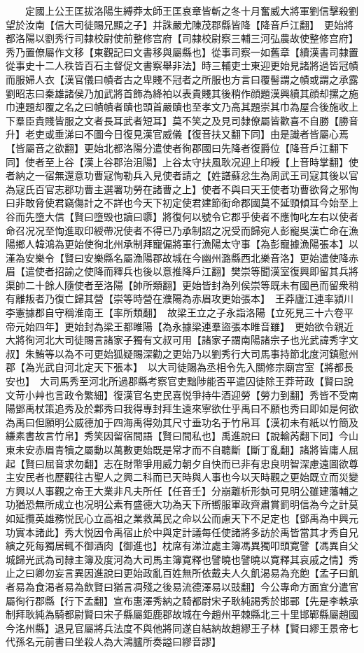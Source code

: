 　　定國上公王匡拔洛陽生縛莽太師王匡哀章皆斬之冬十月奮威大將軍劉信擊殺劉望於汝南【信大司徒賜兄顯之子】并誅嚴尤陳茂郡縣皆降【降音戶江翻】　更始將都洛陽以劉秀行司隸校尉使前整修宫府【司隸校尉察三輔三河弘農故使整修宫府】秀乃置僚屬作文移【東觀記曰文書移與屬縣也】從事司察一如舊章【續漢書司隸置從事史十二人秩皆百石主督促文書察舉非法】時三輔吏士東迎更始見諸將過皆冠幘而服婦人衣【漢官儀曰幘者古之卑賤不冠者之所服也方言曰覆髻謂之幘或謂之承露劉昭志曰秦雄諸侯乃加武將首飾為絳袙以表貴賤其後稍作顔題漢興續其顔却摞之施巾連題却覆之名之曰幘幘者賾也頭首嚴賾也至孝文乃高其題崇其巾為屋合後施收上下羣臣貴賤皆服之文者長耳武者短耳】莫不笑之及見司隸僚屬皆歡喜不自勝【勝音升】老吏或垂涕曰不圖今日復見漢官威儀【復音扶又翻下同】由是識者皆屬心焉【皆屬音之欲翻】更始北都洛陽分遣使者徇郡國曰先降者復爵位【降音戶江翻下同】使者至上谷【漢上谷郡治沮陽】上谷太守扶風耿况迎上印綬【上音時掌翻】使者納之一宿無還意功曹寇恂勒兵入見使者請之【姓譜蘇忿生為周武王司寇其後以官為寇氏百官志郡功曹主選署功勞在諸曹之上】使者不與曰天王使者功曹欲脅之邪恂曰非敢脅使君竊傷計之不詳也今天下初定使君建節䘖命郡國莫不延頸傾耳今始至上谷而先墮大信【賢曰墮毁也讀曰隳】將復何以號令它郡乎使者不應恂叱左右以使者命召况况至恂進取印綬帶况使者不得已乃承制詔之况受而歸宛人彭寵吳漢亡命在漁陽鄉人韓鴻為更始使徇北州承制拜寵偏將軍行漁陽太守事【為彭寵據漁陽張本】以漌為安樂令【賢曰安樂縣名屬漁陽郡故城在今幽州潞縣西北樂音洛】更始遣使降赤眉【遣使者招諭之使降而釋兵也後以意推降戶江翻】樊崇等聞漢室復興即留其兵將渠帥二十餘人隨使者至洛陽【帥所類翻】更始皆封為列侯崇等既未有國邑而留衆稍有離叛者乃復亡歸其營【崇等時營在濮陽為赤眉攻更始張本】　王莽廬江連率潁川李憲據郡自守稱淮南王【率所類翻】　故梁王立之子永詣洛陽【立死見三十六卷平帝元始四年】更始封為梁王都睢陽【為永據梁連羣盜張本睢音雖】　更始欲令親近大將徇河北大司徒賜言諸家子獨有文叔可用【諸家子謂南陽諸宗子也光武諱秀字文叔】朱鮪等以為不可更始狐疑賜深勸之更始乃以劉秀行大司馬事持節北度河鎮慰州郡【為光武自河北定天下張本】　以大司徒賜為丞相令先入關修宗廟宫室【將都長安也】　大司馬秀至河北所過郡縣考察官吏黜陟能否平遣囚徒除王莽苛政【賢曰說文苛小艸也言政令繁細】復漢官名吏民喜悦爭持牛酒迎勞【勞力到翻】秀皆不受南陽鄧禹杖策追秀及於鄴秀曰我得專封拜生遠來寧欲仕乎禹曰不願也秀曰即如是何欲為禹曰但願明公威德加于四海禹得効其尺寸垂功名于竹帛耳【漢初未有紙以竹簡及縑素書故言竹帛】秀笑因留宿間語【賢曰間私也】禹進說曰【說輸芮翻下同】今山東未安赤眉青犢之屬動以萬數更始既是常才而不自聽斷【斷丁亂翻】諸將皆庸人屈起【賢曰屈音求勿翻】志在財幣爭用威力朝夕自快而已非有忠良明智深慮遠圖欲尊主安民者也歷觀往古聖人之興二科而已天時與人事也今以天時觀之更始既立而災變方興以人事觀之帝王大業非凡夫所任【任音壬】分崩離析形埶可見明公雖建藩輔之功猶恐無所成立也况明公素有盛德大功為天下所嚮服軍政齊肅賞罰明信為今之計莫如延攬英雄務悦民心立高祖之業救萬民之命以公而慮天下不足定也【鄧禹為中興元功實本諸此】秀大悦因令禹宿止於中與定計議每任使諸將多訪於禹皆當其才秀自兄縯之死每獨居輒不御酒肉【御進也】枕席有涕泣處主簿馮異獨叩頭寛譬【馮異自父城歸光武為司隸主簿及度河為大司馬主簿寛釋也譬曉也譬曉以寛釋其哀戚之情】秀止之曰卿勿妄言異因進說曰更始政亂百姓無所依戴夫人久飢渴易為充飽【孟子曰飢者易為食渇者易為飲賢曰猶言凋殘之後易流德澤易以豉翻】今公專命方面宜分遣官屬徇行郡縣【行下孟翻】宣布惠澤秀納之騎都尉宋子耿純謁秀於邯鄲【先是李軼承制拜耿純為騎都尉賢曰宋子縣屬鉅鹿郡故城在今趙州平棘縣北三十里邯鄲縣屬趙國今洺州縣】退見官屬將兵法度不與他將同遂自結納故趙繆王子林【賢曰繆王景帝七代孫名元前書曰坐殺人為大鴻臚所奏謚曰繆音謬】

